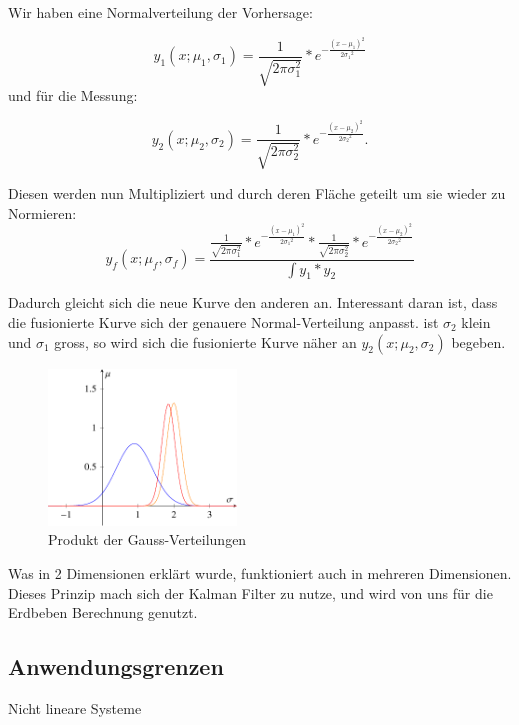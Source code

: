 \documentclass[11pt,a4paper]{article}
\begin{document}
Wir haben eine Normalverteilung der Vorhersage:

\begin{equation}
{y_1}(x;{\mu_1},{\sigma_1})=\frac{1}{\sqrt{2\pi\sigma_1^2}}*e^{-\frac{(x-{\mu_1})^2}{2{\sigma_1}^2}}
\end{equation} 
und für die Messung:

\begin{equation}
{y_2}(x;{\mu_2},{\sigma_2})=\frac{1}{\sqrt{2\pi\sigma_2^2}}*e^{-\frac{(x-{\mu_2})^2}{2{\sigma_2}^2}}.
\end{equation} 

Diesen werden nun Multipliziert und durch deren Fläche geteilt um sie wieder zu Normieren:
\begin{equation}
{y_f}(x;{\mu_f},{\sigma_f})=\frac{ \frac{1}{\sqrt{2\pi\sigma_1^2}}*e^{-\frac{(x-{\mu_1})^2}{2{\sigma_1}^2}} *\frac{1}{\sqrt{2\pi\sigma_2^2}}*e^{-\frac{(x-{\mu_2})^2}{2{\sigma_2}^2}}}{\int {y_1}*{y_2}\,}
\end{equation} 

Dadurch gleicht sich die neue Kurve den anderen an. Interessant daran ist, dass die fusionierte Kurve sich der genauere Normal-Verteilung anpasst. ist ${\sigma_2}$ klein und ${\sigma_1}$ gross, so wird sich die fusionierte Kurve näher an ${y_2}(x;{\mu_2},{\sigma_2})$ begeben. 

 \begin{figure}[h]
 \begin{center}
 \includegraphics[width=5cm]{Gausskurve3}
 \caption{Produkt der Gauss-Verteilungen}
 \end{center}
\end{figure}
Was in 2 Dimensionen erklärt wurde, funktioniert auch in mehreren Dimensionen. Dieses Prinzip mach sich der Kalman Filter zu nutze, und wird von uns für die Erdbeben Berechnung genutzt. 

\subsection{Anwendungsgrenzen}
Nicht lineare Systeme %
\end{document}
